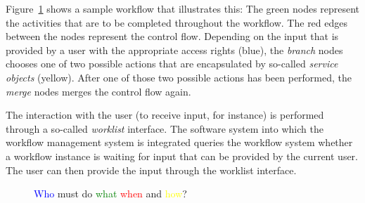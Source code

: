 Figure~\ref{figure-SampleWorkflow} shows a sample workflow that illustrates
this: The green nodes represent the activities that are to be completed
throughout the workflow. The red edges between the nodes represent the control
flow. Depending on the input that is provided by a user with the appropriate
access rights (blue), the \emph{branch} nodes chooses one of two possible
actions that are encapsulated by so-called \emph{service objects} (yellow).
After one of those two possible actions has been performed, the \emph{merge}
nodes merges the control flow again.

The interaction with the user (to receive input, for instance) is performed
through a so-called \emph{worklist} interface. The software system into
which the workflow management system is integrated queries the workflow
system whether a workflow instance is waiting for input that can be
provided by the current user. The user can then provide the input through
the worklist interface.

\begin{figure}[hbtp]
\caption[Who must do what when and how?]{\textcolor{blue}{Who} must do \textcolor{green}{what} \textcolor{red}{when} and \textcolor{yellow}{how}?}
\label{figure-SampleWorkflow}
\end{figure}

